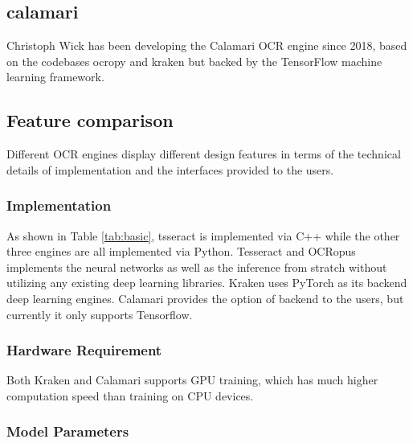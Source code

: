 \documentclass[conference]{IEEEtran}
\begin{document}
\subsection*{calamari}

Christoph Wick has been developing the Calamari \cite{DBLP:journals/corr/abs-1807-02004}
OCR engine since 2018, based on the codebases ocropy and kraken but backed by the
TensorFlow machine learning framework.

\subsection*{Feature comparison}


Different OCR engines display different design features in terms of the technical details of implementation and the interfaces provided to the users. 

\subsubsection*{Implementation}

As shown in Table \ref{tab:basic}, tsseract is implemented via C++ while the other three engines are all implemented via Python.  Tesseract and OCRopus implements the neural networks as well as the inference from stratch without utilizing any existing deep learning libraries. Kraken uses PyTorch as its backend deep learning engines. Calamari provides the option of backend to the users, but currently it only supports Tensorflow.

\subsubsection*{Hardware Requirement}

Both Kraken and Calamari supports GPU training, which has much higher computation speed than training on CPU devices. 

\subsubsection*{Model Parameters}
\end{document}
